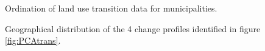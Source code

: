 
\begin{figure}[h!]
\caption{Ordination of land use transition data for municipalities.}
\label{fig:PCAtrans}

\caption{Geographical distribution of the 4 change profiles identified in figure \ref{fig:PCAtrans}.}
\label{fig:maptrans}
\end{figure}

\clearpage